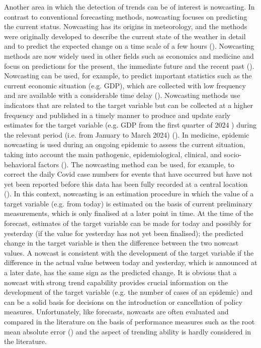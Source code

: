 Another area in which the detection of trends can be of interest is nowcasting. In contrast to conventional forecasting methods, nowcasting focuses on predicting the current status. Nowcasting has its origins in meteorology, and the methods were originally developed to describe the current state of the weather in detail and to predict the expected change on a time scale of a few hours (\cite{browning1989nowcasting,schmid2019nowcasting}). Nowcasting methods are now widely used in other fields such as economics and medicine and focus on predictions for the present, the immediate future and the recent past (\cite{banbura2013now, bok2018macroeconomic}). Nowcasting can be used, for example, to predict important statistics such as the current economic situation (e.g. GDP), which are collected with low frequency and are available with a considerable time delay (\cite{banbura2013now}). Nowcasting methods use indicators that are related to the target variable but can be collected at a higher frequency and published in a timely manner to produce and update early estimates for the target variable (e.g. GDP from the first quarter of 2024 ) during the relevant period (i.e. from January to March 2024) (\cite{castle2017forecasting}). In medicine, epidemic nowcasting is used during an ongoing epidemic to assess the current situation, taking into account the main pathogenic, epidemiological, clinical, and socio-behavioral factors (\cite{wu2021nowcasting}). The nowcasting method can be used, for example, to correct the daily Covid case numbers for events that have occurred but have not yet been reported before this data has been fully recorded at a central location (\cite{gunther2021nowcasting}). In this context, nowcasting is an estimation procedure in which the value of a target variable (e.g. from today) is estimated on the basis of current preliminary measurements, which is only finalised at a later point in time. 
At the time of the forecast, estimates of the target variable can be made for today and possibly for yesterday (if the value for yesterday has not yet been finalised); the predicted change in the target variable is then the difference between the two nowcast values. A nowcast is consistent with the development of the target variable if the difference in the actual value between today and yesterday, which is announced at a later date, has the same sign as the predicted change. It is obvious that a nowcast with strong trend capability provides crucial information on the development of the target variable (e.g. the number of cases of an epidemic) and can be a solid basis for decisions on the introduction or cancellation of policy measures. Unfortunately, like forecasts, nowcasts are often evaluated and compared in the literature on the basis of performance measures such as the root mean absolute error (\cite{gunther2021nowcasting}) and the aspect of trending ability is hardly considered in the literature. 

